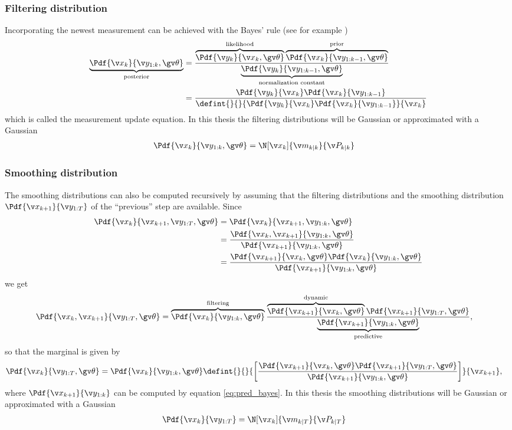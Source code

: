 \subsubsection*{Filtering distribution}
Incorporating the newest measurement can be achieved with the Bayes'
rule (see for example \cite{gelman2004})
\begin{align}
	\underbrace{\Pdf{\xk}{\y_{1:k},\Th}}_\text{posterior}&=\frac{\overbrace{\Pdf{\yk}{\xk,\Th}}^\text{likelihood}\overbrace{\Pdf{\xk}{\y_{1:k-1},\Th}}^\text{prior}}{\underbrace{\Pdf{\y_{k}}{\y_{1:k-1},\Th}}_\text{normalization
	constant}}\nonumber\\
	&=\frac{\Pdf{\yk}{\xk}\Pdf{\xk}{\y_{1:k-1}}}{\defint{}{}{\Pdf{\yk}{\xk}\Pdf{\xk}{\y_{1:k-1}}}{\xk}}
	\label{eq:filt_bayes}
\end{align}
which is called the measurement update equation.
In this thesis the filtering distributions will be Gaussian or approximated with a Gaussian
\begin{align}
	\Pdf{\xk}{\y_{1:k},\Th}&=\N[\xk]{\m_{k|k}}{\P_{k|k}}
\end{align}


\subsubsection*{Smoothing distribution}
The smoothing distributions can also be computed recursively by assuming that the filtering distributions
and the smoothing distribution $\Pdf{\x_{k+1}}{\y_{1:T}}$ of the ``previous'' step are available.
Since
\begin{align*}
	\Pdf{\xk}{\x_{k+1},\y_{1:T},\Th}&=\Pdf{\xk}{\x_{k+1},\y_{1:k},\Th}\\
	&=\frac{\Pdf{\xk,\x_{k+1}}{\y_{1:k},\Th}}{\Pdf{\x_{k+1}}{\y_{1:k},\Th}}\\
	&=\frac{\Pdf{\x_{k+1}}{\xk,\Th}\Pdf{\xk}{\y_{1:k},\Th}}{\Pdf{\x_{k+1}}{\y_{1:k},\Th}}
\end{align*}
we get
\begin{align}
	\Pdf{\xk,\x_{k+1}}{\y_{1:T},\Th}&=\overbrace{\Pdf{\xk}{\y_{1:k},\Th}}^\text{filtering}\frac{\overbrace{\Pdf{\x_{k+1}}{\xk,\Th}}^\text{dynamic}\Pdf{\x_{k+1}}{\y_{1:T},\Th}}{\underbrace{\Pdf{\x_{k+1}}{\y_{1:k},\Th}}_\text{predictive}},
	\label{eq:smooth_joint_bayes}
\end{align}
so that the marginal is given by
\begin{align}
	\Pdf{\xk}{\y_{1:T},\Th}&=\Pdf{\xk}{\y_{1:k},\Th}\defint{}{}{\left[\frac{\Pdf{\x_{k+1}}{\xk,\Th}\Pdf{\x_{k+1}}{\y_{1:T},\Th}}{\Pdf{\x_{k+1}}{\y_{1:k},\Th}}\right]}{\x_{k+1}},
	\label{eq:smooth_bayes}
\end{align}
where $\Pdf{\x_{k+1}}{\y_{1:k}}$ can be computed by equation \eqref{eq:pred_bayes}.
In this thesis the smoothing distributions will be Gaussian or approximated with a Gaussian
\begin{align}
	\Pdf{\xk}{\y_{1:T}}&=\N[\xk]{\m_{k|T}}{\P_{k|T}}
	\label{eq:smoothing_gaussian}
\end{align}

